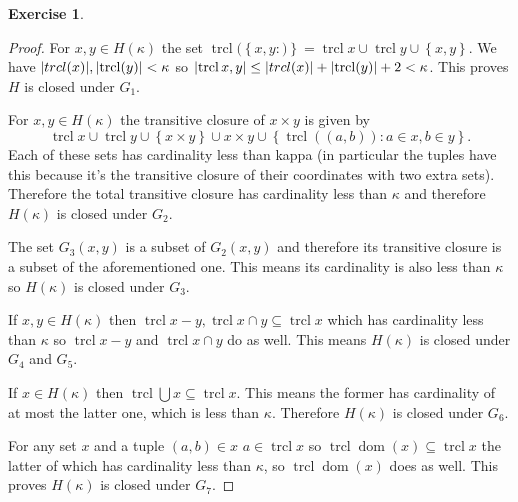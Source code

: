 \documentclass{article}
\theoremstyle{definition}
\newtheorem{question}{Exercise}
\newcommand{\set}[1]{\left\{#1\right\}}
\newcommand{\setwith}[2]{\set{#1\colon#2}}
\DeclareMathOperator{\dom}{dom}
\DeclareMathOperator{\trcl}{trcl}
\DeclarePairedDelimiter{\abs}{|}{|}
\begin{document}
\begin{question}
\begin{enumerate}[a.]
              \begin{proof}
                  For \(x,y\in H(\kappa)\) the set
                  \(\trcl(\setwith{x,y})=\trcl{x}\cup\trcl{y}\cup\set{x,y}\).
                  We have \(\abs{trcl(x)},\abs{\trcl(y)}<\kappa\) so
                  \(\abs{\trcl{x,y}}\leq\abs{trcl(x)}+\abs{\trcl(y)}+2<\kappa\).
                  This proves \(H\) is closed under \(G_{1}\).

                  For \(x,y\in H(\kappa)\) the transitive closure of \(x\times
                  y\) is given by
                  \[
                      \trcl{x}\cup\trcl{y}\cup\set{x\times y}\cup x\times y\cup\setwith{\trcl((a,b))}{a\in x, b\in y}.
                  \]
                  Each of these sets has cardinality less than kappa (in
                  particular the tuples have this because it's the transitive
                  closure of their coordinates with two extra sets). Therefore
                  the total transitive closure has cardinality less than
                  \(\kappa\) and therefore \(H(\kappa)\) is closed under
                  \(G_{2}\).

                  The set \(G_{3}(x,y)\) is a subset of \(G_{2}(x,y)\) and
                  therefore its transitive closure is a subset of the
                  aforementioned one. This means its cardinality is also less
                  than \(\kappa\) so \(H(\kappa)\) is closed under \(G_{3}\).

                  If \(x,y\in H(\kappa)\) then \(\trcl{x-y},\trcl{x\cap
                      y}\subseteq\trcl{x}\) which has cardinality less than
                  \(\kappa\) so \(\trcl{x-y}\) and \(\trcl{x\cap y}\) do as
                  well. This means \(H(\kappa)\) is closed under \(G_{4}\) and
                  \(G_{5}\).

                  If \(x\in H(\kappa)\) then \(\trcl{\bigcup
                      x}\subseteq\trcl{x}\). This means the former has cardinality
                  of at most the latter one, which is less than \(\kappa\).
                  Therefore \(H(\kappa)\) is closed under \(G_{6}\).

                  For any set \(x\) and a tuple \((a,b)\in x\) \(a\in\trcl{x}\)
                  so \(\trcl{\dom(x)}\subseteq\trcl{x}\) the latter of which has
                  cardinality less than \(\kappa\), so \(\trcl{\dom(x)}\) does
                  as well. This proves \(H(\kappa)\) is closed under \(G_{7}\).


\end{proof}
\end{enumerate}
\end{question}
\end{document}
